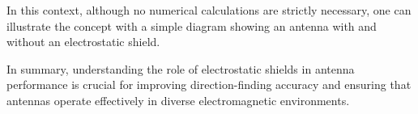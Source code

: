 In this context, although no numerical calculations are strictly necessary, one can illustrate the concept with a simple diagram showing an antenna with and without an electrostatic shield.

\begin{center}
\end{center}

In summary, understanding the role of electrostatic shields in antenna performance is crucial for improving direction-finding accuracy and ensuring that antennas operate effectively in diverse electromagnetic environments.
